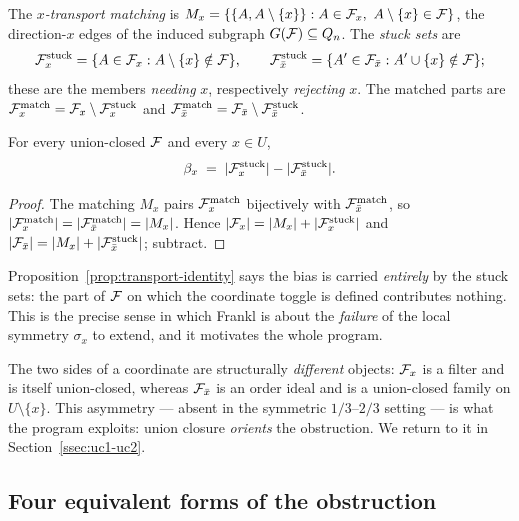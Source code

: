 \begin{definition}
\label{def:transport}
The \emph{$x$-transport matching} is
$M_x=\{\{A,A\setminus\{x\}\}:A\in\F_x,\ A\setminus\{x\}\in\F\}$, the
direction-$x$ edges of the induced subgraph $G(\mathcal{F})\subseteq Q_n$. The
\emph{stuck sets} are
\[
  \mathcal{F}^{\mathrm{stuck}}_x=\{A\in\mathcal{F}_x:A\setminus\{x\}\notin\mathcal{F}\},\qquad
  \mathcal{F}^{\mathrm{stuck}}_{\bar x}=\{A'\in\mathcal{F}_{\bar x}:A'\cup\{x\}\notin\mathcal{F}\};
\]
these are the members \emph{needing} $x$, respectively \emph{rejecting}
$x$. The matched parts are $\mathcal{F}^{\mathrm{match}}_x=\mathcal{F}_x\setminus\mathcal{F}^{\mathrm{stuck}}_x$
and $\mathcal{F}^{\mathrm{match}}_{\bar x}=\mathcal{F}_{\bar x}\setminus\mathcal{F}^{\mathrm{stuck}}_{\bar x}$.
\end{definition}

\begin{proposition}
\label{prop:transport-identity}
For every union-closed $\mathcal{F}$ and every $x\in U$,
\[
  \beta_x \;=\; |\mathcal{F}^{\mathrm{stuck}}_x|-|\mathcal{F}^{\mathrm{stuck}}_{\bar x}|.
\]
\end{proposition}

\begin{proof}
The matching $M_x$ pairs $\mathcal{F}^{\mathrm{match}}_x$ bijectively with
$\mathcal{F}^{\mathrm{match}}_{\bar x}$, so $|\mathcal{F}^{\mathrm{match}}_x|=|\mathcal{F}^{\mathrm{match}}_{\bar
x}|=|M_x|$. Hence $|\mathcal{F}_x|=|M_x|+|\mathcal{F}^{\mathrm{stuck}}_x|$ and
$|\mathcal{F}_{\bar x}|=|M_x|+|\mathcal{F}^{\mathrm{stuck}}_{\bar x}|$; subtract.
\end{proof}

Proposition~\ref{prop:transport-identity} says the bias is carried
\emph{entirely} by the stuck sets: the part of $\mathcal{F}$ on which the
coordinate toggle is defined contributes nothing. This is the precise
sense in which Frankl is about the \emph{failure} of the local symmetry
$\sigma_x$ to extend, and it motivates the whole program.

\begin{remark}
\label{rem:asymmetry}
The two sides of a coordinate are structurally \emph{different}
objects: $\mathcal{F}_x$ is a filter and is itself union-closed, whereas
$\mathcal{F}_{\bar x}$ is an order ideal and is a union-closed family on
$U\setminus\{x\}$. This asymmetry --- absent in the symmetric
$1/3$--$2/3$ setting --- is what the program exploits: union closure
\emph{orients} the obstruction. We return to it in
Section~\ref{ssec:uc1-uc2}.
\end{remark}

\subsection{Four equivalent forms of the obstruction}
\label{ssec:obstruction-forms}

